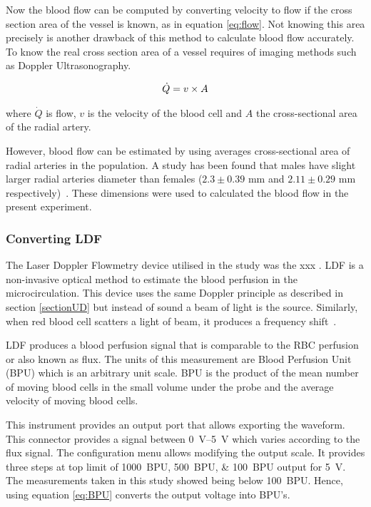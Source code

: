 
Now the blood flow can be computed by converting velocity to flow if the cross section area of the vessel is known, as in equation \ref{eq:flow}. Not knowing this area precisely is another drawback of this method to calculate blood flow accurately. To know the real cross section area of a vessel requires of imaging methods such as Doppler Ultrasonography. 

\begin{align}
	\label{eq:flow}
	\dot{Q} = v \times A \tagaddtext{[\si{\cubic\meter\per\second}]}
\end{align}

where $\dot{Q}$ is flow, $v$ is the velocity of the blood cell and $A$ the cross-sectional area of the radial artery.

However, blood flow can be estimated by using averages cross-sectional area of radial arteries in the population. A study has been found that males have slight larger radial arteries diameter than females ($2.3 \pm 0.39$ mm and $2.11 \pm 0.29$ mm respectively)~\cite{ashraf2010size}. These dimensions were used to calculated the blood flow in the present experiment.

\subsubsection{Converting LDF}
The Laser Doppler Flowmetry device utilised in the study was the xxx
. LDF is a non-invasive optical method to estimate the blood perfusion in the microcirculation. This device uses the same Doppler principle as described in section \ref{sectionUD} but instead of sound a beam of light is the source. Similarly, when red blood cell scatters a light of beam, it produces a frequency shift~\cite{fredriksson2007laser}. 

LDF produces a blood perfusion signal that is comparable to the RBC perfusion or also known as flux. The units of this measurement are Blood Perfusion Unit (BPU) which is an arbitrary unit scale. BPU is the product of the mean number of moving blood cells in the small volume under the probe and the average velocity of moving blood cells. 

This instrument provides an output port that allows exporting the waveform. This connector provides a signal between \SIrange{0}{5}{\volt} which varies according to the flux signal. The configuration menu allows modifying the output scale. It provides three steps at top limit of \SIlist{1000;500;100}{BPU} output for \SI{5}{\volt}. The measurements taken in this study showed being below \SI{100}{BPU}. Hence, using equation \ref{eq:BPU} converts the output voltage into BPU's.

